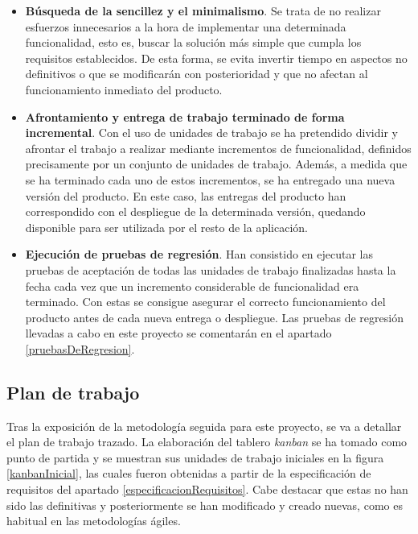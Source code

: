 \documentclass[11pt,spanish,listoffigures]{tfgetsinf}
\begin{document}
\begin{itemize}
	\item \textbf{Búsqueda de la sencillez y el minimalismo}. Se trata de no realizar esfuerzos innecesarios a la hora de implementar una determinada funcionalidad, esto es, buscar la solución más simple que cumpla los requisitos establecidos. De esta forma, se evita invertir tiempo en aspectos no definitivos o que se modificarán con posterioridad y que no afectan al funcionamiento inmediato del producto.

	\item \textbf{Afrontamiento y entrega de trabajo terminado de forma incremental}. Con el uso de unidades de trabajo se ha pretendido dividir y afrontar el trabajo a realizar mediante incrementos de funcionalidad, definidos precisamente por un conjunto de unidades de trabajo. Además, a medida que se ha terminado cada uno de estos incrementos, se ha entregado una nueva versión del producto. En este caso, las entregas del producto han correspondido con el despliegue de la determinada versión, quedando disponible para ser utilizada por el resto de la aplicación.

	\item \textbf{Ejecución de pruebas de regresión}. Han consistido en ejecutar las pruebas de aceptación de todas las unidades de trabajo finalizadas hasta la fecha cada vez que un incremento considerable de funcionalidad era terminado. Con estas se consigue asegurar el correcto funcionamiento del producto antes de cada nueva entrega o despliegue. Las pruebas de regresión llevadas a cabo en este proyecto se comentarán en el apartado \ref{pruebasDeRegresion}.

\end{itemize}


		\subsection{Plan de trabajo} \label{planDeTrabajo}

Tras la exposición de la metodología seguida para este proyecto, se va a detallar el plan de trabajo trazado. La elaboración del tablero \emph{kanban} se ha tomado como punto de partida y se muestran sus unidades de trabajo iniciales en la figura \ref{kanbanInicial}, las cuales fueron obtenidas a partir de la especificación de requisitos del apartado \ref{especificacionRequisitos}. Cabe destacar que estas no han sido las definitivas y posteriormente se han modificado y creado nuevas, como es habitual en las metodologías ágiles.
\end{document}
